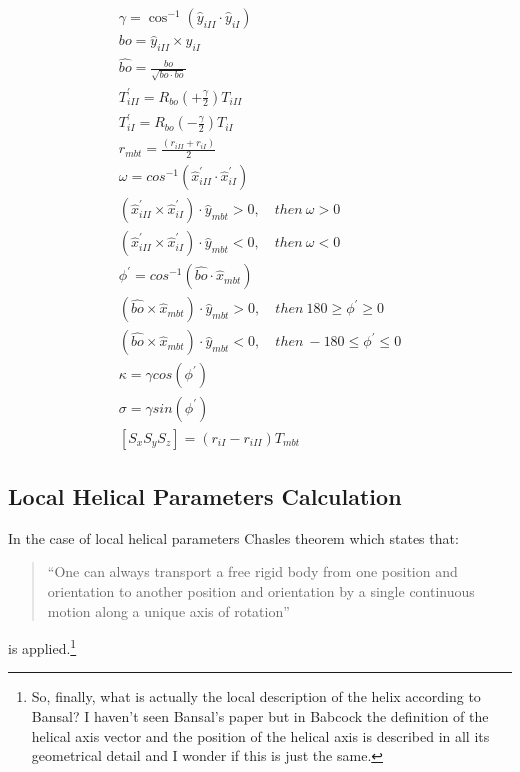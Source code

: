 \begin{gather}
\gamma = \cos^{-1} (\hat{y}_{iII} \cdot \hat{y}_{iI})\\
bo = \hat{y}_{iII} \times \hat{y}_{iI}\\
\hat{bo} = \frac {bo}{\sqrt{bo \cdot bo}}\\
T_{iII}^{'} = R_{bo}(+\frac{\gamma}{2}) T_{iII} \\ 
T_{iI}^{'} = R_{bo}(-\frac{\gamma}{2}) T_{iI}\\
r_{mbt} = \frac{(r_{iII} + r_{iI})} {2}\\
\omega = cos^{-1}(\hat{x}_{iII}^{'} \cdot \hat{x}_{iI}^{'})\\
(\hat{x}_{iII}^{'} \times \hat{x}_{iI}^{'}) \cdot \hat{y}_{mbt} > 0, \quad then \ \omega > 0\\
(\hat{x}_{iII}^{'} \times \hat{x}_{iI}^{'}) \cdot \hat{y}_{mbt} < 0, \quad then \ \omega < 0\\
\phi^{'} = cos^{-1}(\hat{bo} \cdot \hat{x}_{mbt})\\
(\hat{bo} \times \hat{x}_{mbt}) \cdot \hat{y}_{mbt} > 0, \quad then \ 180 \geq \phi^{'} \geq 0\\
(\hat{bo} \times \hat{x}_{mbt}) \cdot \hat{y}_{mbt} < 0, \quad then \ -180 \leq \phi^{'} \leq 0\\
\kappa = \gamma cos (\phi^{'})\\
\sigma = \gamma sin (\phi^{'})\\
[S_xS_yS_z]=(r_{iI} - r_{iII})T_{mbt}
\end{gather}


\subsection{Local Helical Parameters Calculation}

In the case  of local helical parameters Chasles  theorem which states
that:
\begin{quote}
``One  can always transport a  free rigid body  from one position
and  orientation  to another  position  and  orientation  by a  single
continuous   motion   along   a    unique   axis   of   rotation''
\end{quote}
is applied\cite{babcock1994}.\footnote{So, finally, what  is actually  the local
description of the helix according to Bansal?  I haven't seen Bansal's
paper but in Babcock the definition of the helical axis vector and the
position  of the  helical axis  is  described in  all its  geometrical
detail and I wonder if this is just the same.}

